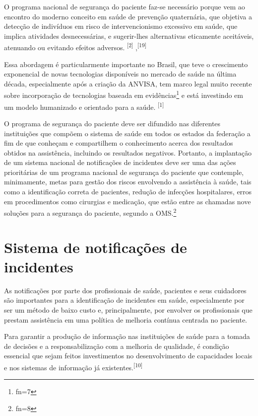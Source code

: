 \documentclass{article}
\makeatletter
\newcommand{\fn}{\afterassignment\fn@aux\count0=}
\newcommand{\fn@aux}{\csname fn\the\count0\endcsname}
\makeatother
\begin{document}
O programa nacional de segurança do paciente faz-se necessário porque vem ao
encontro do
moderno conceito em saúde de prevenção quaternária, que objetiva a detecção de
indivíduos em
risco de intervencionismo excessivo em saúde, que implica atividades
desnecessárias, e
sugerir-lhes alternativas eticamente aceitáveis, atenuando ou evitando efeitos
adversos.
\textsuperscript{[2]}
,\textsuperscript{[19]}

Essa abordagem é particularmente importante no Brasil, que teve o crescimento
exponencial
de novas tecnologias disponíveis no mercado de saúde na última década,
especialmente após a
criação da ANVISA, tem marco legal muito recente sobre incorporação de
tecnologias baseada
em evidências\footnote{\fn7}
e está investindo em um modelo humanizado e orientado para a saúde.
\textsuperscript{[1]}

O programa de segurança do paciente deve ser difundido nas diferentes
instituições que
compõem o sistema de saúde em todos os estados da federação a fim de que
conheçam e
compartilhem o conhecimento acerca dos resultados obtidos na assistência,
incluindo os
resultados negativos. Portanto, a implantação de um sistema nacional de
notificações de
incidentes deve ser uma das ações prioritárias de um programa nacional de
segurança do
paciente que contemple, minimamente, metas para gestão dos riscos envolvendo a
assistência à
saúde, tais como a identificação correta de pacientes, redução de infecções
hospitalares,
erros em procedimentos como cirurgias e medicação, que estão entre as chamadas
nove soluções
para a segurança do paciente, segundo a OMS.\footnote{\fn8}

\section{Sistema de notificações de incidentes}

As notificações por parte dos profissionais de saúde, pacientes e seus
cuidadores são
importantes para a identificação de incidentes em saúde, especialmente por ser
um método de
baixo custo e, principalmente, por envolver os profissionais que prestam
assistência em uma
política de melhoria contínua centrada no paciente.

Para garantir a produção de informação nas instituições de saúde para a tomada
de decisões
e a responsabilização com a melhoria de qualidade, é condição essencial que
sejam feitos
investimentos no desenvolvimento de capacidades locais e nos sistemas de
informação já
existentes.\textsuperscript{[10]}
\end{document}
